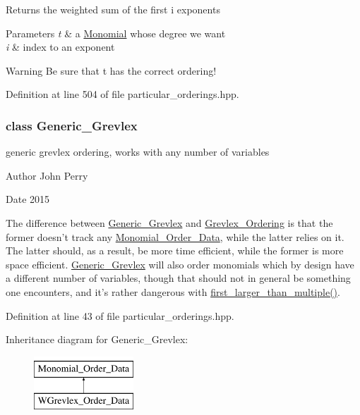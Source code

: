 \begin{DoxyReturn}{Returns}
the weighted sum of the first i exponents 
\end{DoxyReturn}

\begin{DoxyParams}{Parameters}
{\em t} & a \hyperlink{group__polygroup_class_monomial}{Monomial} whose degree we want \\
\hline
{\em i} & index to an exponent \\
\hline
\end{DoxyParams}
\begin{DoxyWarning}{Warning}
Be sure that {\ttfamily t} has the correct ordering! 
\end{DoxyWarning}


Definition at line 504 of file particular\+\_\+orderings.\+hpp.

\label{class_generic___grevlex}
\subsubsection{class Generic\+\_\+\+Grevlex}
generic grevlex ordering, works with any number of variables 

\begin{DoxyAuthor}{Author}
John Perry 
\end{DoxyAuthor}
\begin{DoxyDate}{Date}
2015
\end{DoxyDate}
The difference between \hyperlink{group__orderinggroup_class_generic___grevlex}{Generic\+\_\+\+Grevlex} and \hyperlink{group__orderinggroup_class_grevlex___ordering}{Grevlex\+\_\+\+Ordering} is that the former doesn't track any \hyperlink{group__orderinggroup_class_monomial___order___data}{Monomial\+\_\+\+Order\+\_\+\+Data}, while the latter relies on it. The latter should, as a result, be more time efficient, while the former is more space efficient. \hyperlink{group__orderinggroup_class_generic___grevlex}{Generic\+\_\+\+Grevlex} will also order monomials which by design have a different number of variables, though that should not in general be something one encounters, and it's rather dangerous with \hyperlink{group__orderinggroup_a1696724ba30a8565b759bb2c8aeefde4}{first\+\_\+larger\+\_\+than\+\_\+multiple()}. 

Definition at line 43 of file particular\+\_\+orderings.\+hpp.

Inheritance diagram for Generic\+\_\+\+Grevlex\+:\begin{figure}[H]
\begin{center}
\leavevmode
\includegraphics[height=2.000000cm]{group__orderinggroup}
\end{center}
\end{figure}
